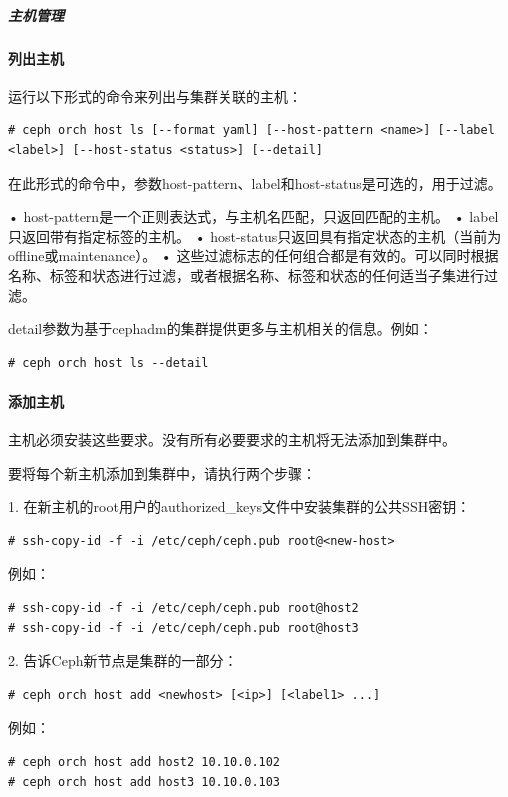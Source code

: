 \documentclass[12pt,UTF8]{ctexbook}
\begin{document}
\subparagraph{主机管理}

\paragraph{列出主机}

运行以下形式的命令来列出与集群关联的主机：
\begin{verbatim}
# ceph orch host ls [--format yaml] [--host-pattern <name>] [--label <label>] [--host-status <status>] [--detail]
\end{verbatim}

在此形式的命令中，参数host-pattern、label和host-status是可选的，用于过滤。

• host-pattern是一个正则表达式，与主机名匹配，只返回匹配的主机。
• label只返回带有指定标签的主机。
• host-status只返回具有指定状态的主机（当前为offline或maintenance）。
• 这些过滤标志的任何组合都是有效的。可以同时根据名称、标签和状态进行过滤，或者根据名称、标签和状态的任何适当子集进行过滤。

detail参数为基于cephadm的集群提供更多与主机相关的信息。例如：
\begin{verbatim}
# ceph orch host ls --detail
\end{verbatim}

\paragraph{添加主机}

主机必须安装这些要求。没有所有必要要求的主机将无法添加到集群中。

要将每个新主机添加到集群中，请执行两个步骤：

1. 在新主机的root用户的authorized_keys文件中安装集群的公共SSH密钥：
\begin{verbatim}
# ssh-copy-id -f -i /etc/ceph/ceph.pub root@<new-host>
\end{verbatim}

例如：
\begin{verbatim}
# ssh-copy-id -f -i /etc/ceph/ceph.pub root@host2
# ssh-copy-id -f -i /etc/ceph/ceph.pub root@host3
\end{verbatim}

2. 告诉Ceph新节点是集群的一部分：
\begin{verbatim}
# ceph orch host add <newhost> [<ip>] [<label1> ...]
\end{verbatim}

例如：
\begin{verbatim}
# ceph orch host add host2 10.10.0.102
# ceph orch host add host3 10.10.0.103
\end{verbatim}
\end{document}
